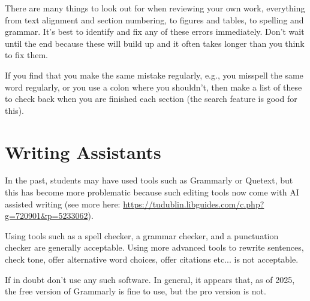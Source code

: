 There are many things to look out for when reviewing your own work, everything
from text alignment and section numbering, to figures and tables, to spelling
and grammar. It's best to identify and fix any of these errors immediately.
Don't wait until the end because these will build up and it often takes longer
than you think to fix them.

If you find that you make the same mistake regularly, e.g., you misspell the
same word regularly, or you use a colon where you shouldn't, then make a list
of these to check back when you are finished each section (the search feature
is good for this).

\newpage
\section{Writing Assistants} \label{App:writing_assist}
In the past, students may have used tools such as Grammarly or Quetext, but
this has become more problematic because such editing tools now come with AI
assisted writing (see more here:
\url{https://tudublin.libguides.com/c.php?g=720901&p=5233062}).

Using tools such as a spell checker, a grammar checker, and a punctuation
checker are generally acceptable. Using more advanced tools to rewrite
sentences, check tone, offer alternative word choices, offer citations etc...
is not acceptable.

If in doubt don't use any such software. In general, it appears that, as of
2025, the free version of Grammarly is fine to use, but the pro version is not.

\newpage

